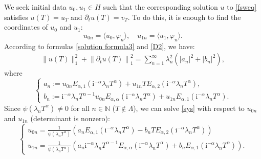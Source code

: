 \documentclass[10pt,a4paper]{amsart}
\makeatletter
\renewenvironment{proof}[1][\proofname]{\par
  \pushQED{\qed}%
  \normalfont \topsep6\p@\@plus6\p@\relax
  \trivlist
  \item[\hskip\labelsep\bfseries #1\@addpunct{.}]%
}{%
  \popQED\endtrivlist\@endpefalse
}
\makeatother
\begin{document}
\begin{proof}
We seek initial data $u_0, u_1 \in H$ such that the corresponding solution $u$ to \eqref{fsweq} satisfies $u(T)=u_T$ and $\partial_t u(T)=v_T.$ To do this, it is enough to find the coordinates of $u_0$ and $u_1$:
$$
u_{0n}=\langle u_0, \varphi_{n}\rangle, \quad u_{1n}=\langle u_1, \varphi_{n}\rangle.
$$
According to formulas \eqref{solution formula3} and \eqref{D2}, we have:
\begin{equation}\label{eq0}
\begin{aligned}
\|u(T)\|_{1}^2+\left\|\partial_t u(T)\right\|_{1}^2
= \sum_{n=1}^{\infty}  \lambda_n^2\left(\left|a_n\right|^2+\left|b_n\right|^2\right),
\end{aligned}
\end{equation}
where 
\begin{equation}\label{sys}
\left\{\begin{array}{l}
a_{n}:=u_{0n} E_{\alpha, 1}\left(\mathrm{i}^{-\alpha}\lambda_n T^\alpha\right)+u_{1n} T E_{\alpha, 2}\left(\mathrm{i}^{-\alpha}\lambda_n T^\alpha\right), \\
b_{n}:=\mathrm{i}^{-\alpha}\lambda_n T^{\alpha-1} u_{0n} E_{\alpha, \alpha}\left(\mathrm{i}^{-\alpha}\lambda_n T^\alpha\right)+u_{1n} E_{\alpha, 1}\left(\mathrm{i}^{-\alpha}\lambda_n T^\alpha\right).
\end{array}\right.
\end{equation}
Since $\psi\left(\lambda_n T^\alpha\right) \neq 0$ for all $n \in \mathbb{N}$ ($T\notin \Lambda$), we can solve \eqref{sys} with respect to $u_{0n}$ and $u_{1n}$ (determinant is nonzero):
$$
\left\{\begin{array}{l}
u_{0n}=\frac{1}{\psi\left(\lambda_n T^\alpha\right)}\left(a_n E_{\alpha, 1}\left(\mathrm{i}^{-\alpha}\lambda_n T^\alpha\right)-b_n T E_{\alpha, 2}\left(\mathrm{i}^{-\alpha}\lambda_n T^\alpha\right)\right) \\
u_{1n}=\frac{1}{\psi\left(\lambda_n T^\alpha\right)}\left(a_n \mathrm{i}^{-\alpha}\lambda_n T^{\alpha-1} E_{\alpha, \alpha}\left(\mathrm{i}^{-\alpha}\lambda_n T^\alpha\right)+b_n E_{\alpha, 1}\left(\mathrm{i}^{-\alpha}\lambda_n T^\alpha\right)\right).

\end{array}$$
\end{proof}
\end{document}
